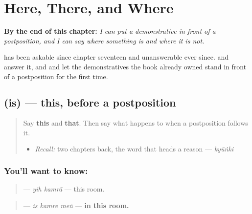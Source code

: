
\chapter{Here, There, and Where}
\label{ch:ur-here-there-and-where}

\begin{chapteropening}
\textbf{By the end of this chapter:} \emph{I can put a demonstrative in front of a postposition, and I can say where something is and where it is not.}

 has been askable since chapter seventeen and unanswerable ever since.  and  answer it, and  and  let the demonstratives the book already owned stand in front of a postposition for the first time.
\end{chapteropening}

\section[\texorpdfstring{\ur{اس} (is)}{اس (is)}]{ (is) — this, before a postposition}

\label{lesson:UR-C24-is}



\begin{quote}
Say \textbf{this} and \textbf{that}. Then say what happens to \textbf{} when a postposition follows it.

\begin{itemize}
\raggedright
  \item \emph{Recall:} two chapters back, the word that heads a reason — \emph{kyūṅki}
\end{itemize}
\end{quote}

\subsection*{You'll want to know: }
\begin{quote}
\textbf{ } — \emph{yih kamrā} — this room.
\end{quote}

\begin{quote}
\textbf{  } — \emph{is kamre meṅ} — \textbf{in this room.}
\end{quote}

